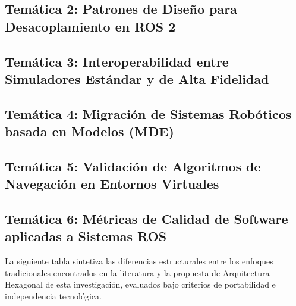 \subsection{Temática 2: Patrones de Diseño para Desacoplamiento en ROS 2}

\subsection{Temática 3: Interoperabilidad entre Simuladores Estándar y de Alta Fidelidad}

\subsection{Temática 4: Migración de Sistemas Robóticos basada en Modelos (MDE)}

\subsection{Temática 5: Validación de Algoritmos de Navegación en Entornos Virtuales}

\subsection{Temática 6: Métricas de Calidad de Software aplicadas a Sistemas ROS}


\bigskip

\noindent La siguiente tabla sintetiza las diferencias estructurales entre los enfoques tradicionales encontrados en la literatura y la propuesta de Arquitectura Hexagonal de esta investigación, evaluados bajo criterios de portabilidad e independencia tecnológica.

